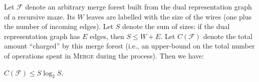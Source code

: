\documentclass[a4paper,UKenglish,cleveref, autoref]{lipics-v2021}
\begin{document}
  

  

Let $\mathcal{F}$ denote an arbitrary merge forest built from the dual
representation graph of a recursive maze. Its $W$ leaves are labelled with the
size of the wires (one plus the number of incoming edges). Let $S$ denote the
sum of sizes: if the dual representation graph has $E$ edges, then
$S \leq W + E$.  Let $C(\mathcal{F})$ denote the total amount ``charged'' by
this merge forest (i.e., an upper-bound on the total number of operations spent
in \textsc{Merge} during the process). Then we have:


\begin{lemma}
  $C(\mathcal{F}) \leq S \log_2 S$.
\end{lemma}

\end{document}
